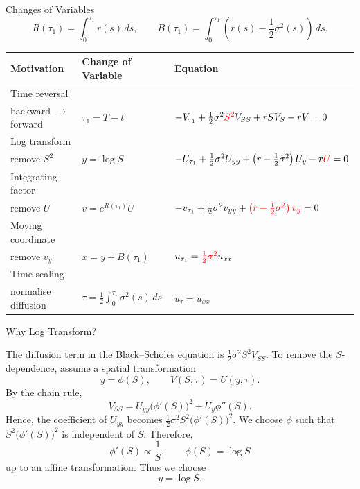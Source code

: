 \documentclass{beamer}
\begin{document}
\begin{frame}{Changes of Variables}
\footnotesize
\[
R(\tau_1)=\int_0^{\tau_1}r(s)\,ds,
\qquad
B(\tau_1)=\int_0^{\tau_1}
\left(r(s)-\frac12\sigma^2(s)\right)\,ds.
\]
\setlength{\tabcolsep}{2pt}
\renewcommand{\arraystretch}{1.0}
\begin{tabular}{p{}
                p{}
                p{}}
\toprule
\textbf{Motivation}
&
\textbf{Change of Variable}
&
\textbf{Equation}
\\
\midrule
Time reversal\\
backward $\to$ forward
&
$\tau_1=T-t$
&
$-V_{\tau_1}
+\frac12\sigma^2\textcolor{red}{S^2}V_{SS}
+rSV_S-rV=0$
\\[0.02cm]

Log transform\\
remove $S^2$
&
$y=\log S$
&
$-U_{\tau_1}
+\frac12\sigma^2U_{yy}
+\left(r-\frac12\sigma^2\right)U_y-r\textcolor{red}{U}=0$
\\[0.02cm]

Integrating factor\\
remove $U$
&
$v=e^{R(\tau_1)}U$
&
$-v_{\tau_1}
+\frac12\sigma^2v_{yy}
+\textcolor{red}{\left(r-\frac12\sigma^2\right)v_y}=0$
\\[0.02cm]

Moving coordinate\\
remove $v_y$
&
$x=y+B(\tau_1)$
&
$u_{\tau_1}=\textcolor{red}{\frac12\sigma^2}u_{xx}$
\\[0.02cm]

Time scaling\\
normalise diffusion
&
$\displaystyle
\tau=\frac12\int_0^{\tau_1}\sigma^2(s)\,ds$
&
$u_\tau=u_{xx}$
\\

\bottomrule
\end{tabular}
\end{frame}

\begin{frame}{Why Log Transform?}

The diffusion term in the Black--Scholes equation is $\frac{1}{2}\sigma^2S^2V_{SS}.$ To remove the \(S\)-dependence, assume a spatial transformation
\[
y=\phi(S),
\qquad
V(S,\tau)=U(y,\tau).
\]
By the chain rule,
\[
V_{SS}
=
U_{yy}\bigl(\phi'(S)\bigr)^2
+
U_y\phi''(S).
\]
Hence, the coefficient of \(U_{yy}\) becomes $\frac{1}{2}\sigma^2S^2\bigl(\phi'(S)\bigr)^2.$
We choose \(\phi\) such that $S^2\bigl(\phi'(S)\bigr)^2$ is independent of \(S\). Therefore,
\[
\phi'(S)\propto\frac{1}{S},
\qquad
\phi(S)=\log S
\]
up to an affine transformation. Thus we choose
\[
\boxed{y=\log S}.
\]
\end{frame}
\end{document}
